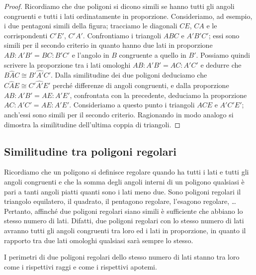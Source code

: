 \begin{figure*}[!htb]
	\centering
\end{figure*}

\begin{proof}
Ricordiamo che due poligoni si dicono simili se hanno tutti gli 
angoli congruenti e tutti i lati ordinatamente in proporzione. 
Consideriamo, ad esempio, i due pentagoni simili della figura; 
tracciamo le diagonali $CE$, $CA$ e le corrispondenti $C'E'$, $C'A'$. 
Confrontiamo i triangoli $ABC$ e $A'B'C'$; essi sono simili per il 
secondo criterio in quanto hanno due lati in proporzione $AB : A'B' = 
BC : B'C'$ e l'angolo in $B$ congruente a quello in $B'$. Possiamo 
quindi scrivere la proporzione tra i lati omologhi $AB : A'B' = AC : 
A'C'$ e dedurre che $B\widehat{A}C\cong B'\widehat{A'}C'$. Dalla 
similitudine dei due poligoni deduciamo che $C\widehat{A}E\cong 
C'\widehat{A'}E'$ perché differenze di angoli congruenti, e dalla 
proporzione $AB:A'B'=AE:A'E'$, confrontata con la precedente, 
deduciamo la proporzione $AC:A'C'=AE:A'E'$. Consideriamo a questo 
punto i triangoli $ACE$ e $A'C'E'$; anch'essi sono simili per il 
secondo criterio. Ragionando in modo analogo si dimostra la 
similitudine dell'ultima coppia di triangoli.
\end{proof}

\subsection{Similitudine tra poligoni regolari}

Ricordiamo che un poligono si definisce regolare quando ha tutti i 
lati e tutti gli angoli congruenti e che la somma degli angoli 
interni di un poligono qualsiasi è pari a tanti angoli piatti quanti 
sono i lati meno due. Sono poligoni regolari il triangolo equilatero, 
il quadrato, il pentagono regolare, l'esagono regolare, \ldots{} 
Pertanto, affinché due poligoni regolari siano simili è sufficiente 
che abbiano lo stesso numero di lati. Difatti, due poligoni regolari 
con lo stesso numero di lati avranno tutti gli angoli congruenti tra 
loro ed i lati in proporzione, in quanto il rapporto tra due lati 
omologhi qualsiasi sarà sempre lo stesso.

\begin{teorema}
I perimetri di due poligoni regolari dello stesso numero di lati 
stanno tra loro come i rispettivi raggi e come i rispettivi apotemi.
\end{teorema}

